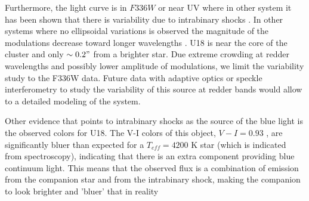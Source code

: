 \documentclass{article}
\begin{document}
\begin{displayquote}
Furthermore, the light curve is in $F336W$ or near UV where in other system it has been shown that there is variability due to intrabinary shocks \cite[e.g.][]{Liliana201847Tuc}. In other systems where no ellipsoidal variations is observed the magnitude of the modulations decrease toward longer wavelengths \cite[e.g.][]{Baglio2016}. U18 is near the core of the cluster and only $\sim 0.2"$ from a brighter star. Due extreme crowding at redder wavelengths and possibly lower amplitude of modulations, we limit the variability study to the F336W data. Future data with adaptive optics or speckle interferometry to study the variability of this source at redder bands would allow to a detailed modeling of the system. 
 
Other evidence that points to intrabinary shocks as the source of the blue light is the observed colors for U18. The V-I colors of this object, $V-I = 0.93$ \citep{Pallanca2017Halpha}, are significantly bluer than expected for a $T_{eff}=4200$ K star \citep{Mamajek2013} (which is indicated from spectroscopy), indicating that there is an extra component providing blue continuum light. This means that the observed flux is a combination of emission from the companion star and from the intrabinary shock, making the companion to look brighter and ’bluer’ that in reality



\end{displayquote}
\end{document}
